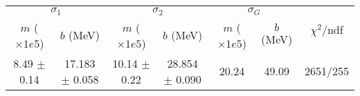 \begin{tabular}{cc|cc|cc||c}
\multicolumn{2}{c|}{$\sigma_1$} & \multicolumn{2}{|c}{$\sigma_2$} & \multicolumn{2}{|c}{$\sigma_G$}  & \multirow{2}{*}{$\chi^2/$ndf}\\
$m$ ($\times1e5$) & $b$ (MeV) & $m$ ($\times1e5$) & $b$ (MeV) & $m$ ($\times1e5$) & $b$ (MeV) & \\
\hline
8.49 $\pm$ 0.14 & 17.183 $\pm$ 0.058 & 10.14 $\pm$ 0.22 & 28.854 $\pm$ 0.090 & 20.24 & 49.09 & 2651/255\\
\end{tabular}

